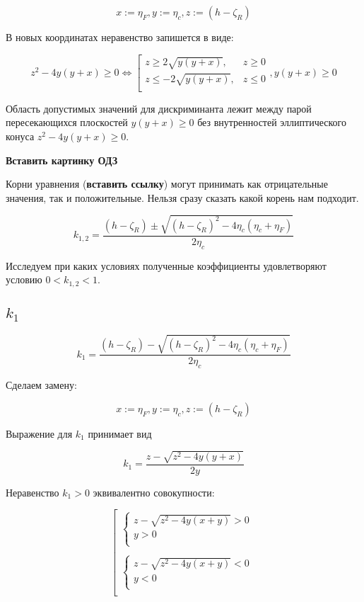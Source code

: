 $$
x:=\eta_F,y := \eta_c, z:= (h-\zeta_R)
$$

В новых координатах неравенство запишется в виде:

$$
z^2-4y(y+x) \geq 0 \Leftrightarrow 
\left[
\begin{array}{rl}
z\geq2\sqrt{y(y+x)}, & z\geq 0  \\
z\leq-2\sqrt{y(y+x)}, & z \leq 0 \\
\end{array}
\right.,
y(y+x)\geq 0
$$

Область допустимых значений для дискриминанта лежит между парой пересекающихся плоскостей $y(y+x) \geq 0$ без внутренностей эллиптического конуса $z^2-4y(y+x)\geq 0$.

\textbf{Вставить картинку ОДЗ}

Корни уравнения (\textbf{вставить ссылку}) могут принимать как отрицательные значения, так и положительные. Нельзя сразу сказать какой корень нам подходит.

$$
k_{1,2} = \dfrac{(h-\zeta_R)\pm\sqrt{(h-\zeta_R)^2-4\eta_c(\eta_c+\eta_F)}}{2\eta_c}
$$

Исследуем при каких условиях полученные коэффициенты удовлетворяют условию $0<k_{1,2}<1$.

\subsection{$k_1$}

$$
k_1 = \dfrac{(h-\zeta_R)-\sqrt{(h-\zeta_R)^2-4\eta_c(\eta_c+\eta_F)}}{2\eta_c}
$$

Сделаем замену:

$$
x:=\eta_F,y := \eta_c, z:= (h-\zeta_R)
$$

Выражение для $k_1$ принимает вид

$$
k_1 = \dfrac{z-\sqrt{z^2-4y(y+x)}}{2y}
$$

Неравенство $k_1>0$ эквивалентно совокупности:

$$
\left[
\begin{array}{l}
\left\{
    \begin{array}{l}
    z-\sqrt{z^2-4y(x+y)}>0\\
    y>0 \\
    \end{array}
    \right.\\
    \\
    \left\{
    \begin{array}{l}
    z-\sqrt{z^2-4y(x+y)}<0\\
    y<0\\
    \end{array}
    \right.\\
\end{array}
\right.
$$

